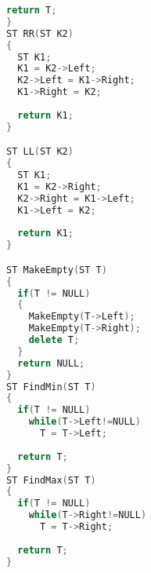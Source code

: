\documentclass[UTF8]{report}
\numberwithin{figure}{subsection}
\numberwithin{table}{subsection}
\begin{document}
\begin{lstlisting}[language=c++]
  return T;
}
ST RR(ST K2)
{
  ST K1;
  K1 = K2->Left;
  K2->Left = K1->Right;
  K1->Right = K2;
  
  return K1;
}

ST LL(ST K2)
{
  ST K1;
  K1 = K2->Right;
  K2->Right = K1->Left;
  K1->Left = K2;
  
  return K1;
}

ST MakeEmpty(ST T)
{
  if(T != NULL)
  {
    MakeEmpty(T->Left);
    MakeEmpty(T->Right);
    delete T;
  }
  return NULL;
}
ST FindMin(ST T)
{
  if(T != NULL)
    while(T->Left!=NULL)
      T = T->Left;
  
  return T;
}
ST FindMax(ST T)
{
  if(T != NULL)
    while(T->Right!=NULL)
      T = T->Right;
  
  return T;
}
\end{lstlisting}
\end{document}
